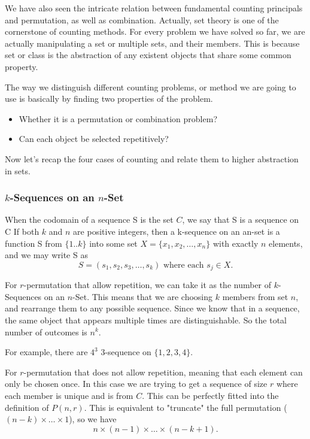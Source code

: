         We have also seen the intricate relation between fundamental counting principals and permutation, as well as combination. Actually, set theory is one of the cornerstone of counting
        methods. For every problem we have solved so far, we are actually manipulating a set or multiple sets, and their members. This is because set or class is the abstraction of any
        existent objects that share some common property.

        The way we distinguish different counting problems, or method we are going to use is basically by finding two properties of the problem.
        \begin{itemize}
            \item Whether it is a permutation or combination problem?
            \item Can each object be selected repetitively? 
        \end{itemize}

        Now let's recap the four cases of counting and relate them to higher abstraction in sets.
        
        \subsubsection*{$k$-Sequences on an $n$-Set}
        
        \begin{definition}
            When the codomain of a sequence S is the set $C$, we say that S is a sequence on C If both $k$ and $n$ are positive integers, then a k-sequence on an an-set is a 
            function S from $\{1..k\}$ into some set $X=\{x_1,x_2,\ldots,x_n\}$ with exactly $n$ elements, and we may write S as
            $$S=(s_1,s_2,s_3,\ldots,s_k) \text{ where each } s_j\in X.$$
        \end{definition} 
        For $r$-permutation that allow repetition, we can take it as the number of $k$-Sequences on an $n$-Set. This means that we are choosing $k$
        members from set $n$, and rearrange them to any possible sequence. Since we know that in a sequence, the same object that appears multiple times are distinguishable.
        So the total number of outcomes is $n^k$.

        For example, there are $4^3$ 3-sequence on $\{1,2,3,4\}$.

        For $r$-permutation that does not allow repetition, meaning that each element can only be chosen once. In this case we are trying to get a sequence of size $r$ where
        each member is unique and is from $C$. This can be perfectly fitted into the definition of $P(n,r)$.
        This is equivalent to "truncate" the full permutation ($(n-k)\times \dots \times 1$), so we have 
        $$n\times(n-1)\times \dots \times(n-k+1).$$

